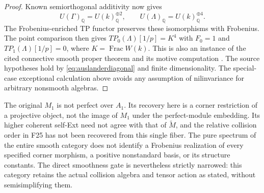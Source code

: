 \documentclass[11pt,a4paper]{article}
\newcommand{\Q}{\mathbb Q}\newcommand{\Z}{\mathbb Z}\newcommand{\C}{\mathbb C}\newcommand{\N}{\mathbb N}\newcommand{\F}{\mathbb F}
\renewcommand{\S}{\ensuremath{\mathsection}}
\newcommand{\fid}[1]{\textsf{#1}}\newcommand{\gate}[1]{\textsf{#1}}
\theoremstyle{named}\newtheorem{finding}{Finding}[section]
\theoremstyle{definition}\newtheorem{definition}[finding]{Definition}
\theoremstyle{remark}\newtheorem{remark}[finding]{Remark}
\begin{document}
\begin{proof}
Known semiorthogonal additivity
\cite[Example~12.3, p.~24]{TabuadaWeil} now gives
\[
 U(\Gamma)_{\Q}=U(k)_{\Q}^{\oplus2},\qquad
 U(\Lambda)_{\Q}=U(k)_{\Q}^{\oplus4}.
\]
The Frobenius-enriched TP functor
\cite[\S6.2, equation~(6.9), p.~16]{TabuadaWeil}
preserves these isomorphisms with Frobenius. The point comparison
\cite[\S7, equations~(7.1)--(7.4), p.~17]{TabuadaWeil}
then gives $TP_0(\Lambda)[1/p]=K^4$ with $F_0=1$ and
$TP_1(\Lambda)[1/p]=0$, where $K=\operatorname{Frac}W(k)$.
This is also an instance of the cited connective smooth proper
theorem and its motive computation
\cite[Theorem~2.12, p.~8; proof, equation~(12.6), p.~26]{TabuadaWeil}.
The source hypotheses hold by \eqref{eq:auslanderdiagonal} and
finite dimensionality. The special-case exceptional calculation
above avoids any assumption of nilinvariance for arbitrary
nonsmooth algebras.
\end{proof}

The original $M_1$ is not perfect over $A_1$. Its recovery here
is a corner restriction of a projective object, not the image of
$M_1$ under the perfect-module embedding. Its higher coherent
self-Ext need not agree with that of $\widetilde M$, and the
relative collision order in \fid{F25} has not been recovered
from this single fiber. The pure spectrum of the entire smooth
category does not identify a Frobenius realization of every
specified corner morphism, a positive nonstandard basis, or its
structure constants. The direct smoothness gate is nevertheless
strictly narrowed: this category retains the actual collision
algebra and tensor action as stated, without semisimplifying them.
\end{document}
